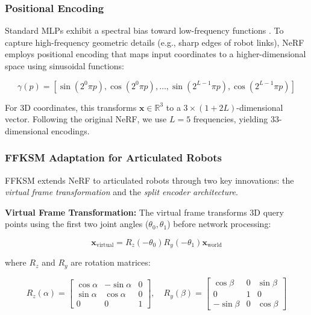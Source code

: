 \documentclass[12pt,a4paper,oneside]{report}
\begin{document}
\subsubsection{Positional Encoding}

Standard MLPs exhibit a spectral bias toward low-frequency functions \cite{rahaman2019spectral}. To capture high-frequency geometric details (e.g., sharp edges of robot links), NeRF employs positional encoding that maps input coordinates to a higher-dimensional space using sinusoidal functions:

\begin{equation}
\gamma(p) = [\sin(2^0 \pi p), \cos(2^0 \pi p), \ldots, \sin(2^{L-1} \pi p), \cos(2^{L-1} \pi p)]
\end{equation}

For 3D coordinates, this transforms $\mathbf{x} \in \mathbb{R}^3$ to a $3 \times (1 + 2L)$-dimensional vector. Following the original NeRF, we use $L = 5$ frequencies, yielding 33-dimensional encodings.

\subsubsection{FFKSM Adaptation for Articulated Robots}

FFKSM extends NeRF to articulated robots through two key innovations: the \textit{virtual frame transformation} and the \textit{split encoder architecture}.

\textbf{Virtual Frame Transformation:} The virtual frame transforms 3D query points using the first two joint angles ($\theta_0, \theta_1$) before network processing:

\begin{equation}
\mathbf{x}_{\text{virtual}} = R_z(-\theta_0) R_y(-\theta_1) \mathbf{x}_{\text{world}}
\end{equation}

where $R_z$ and $R_y$ are rotation matrices:

\begin{equation}
R_z(\alpha) = \begin{bmatrix}
\cos\alpha & -\sin\alpha & 0 \\
\sin\alpha & \cos\alpha & 0 \\
0 & 0 & 1
\end{bmatrix}, \quad
R_y(\beta) = \begin{bmatrix}
\cos\beta & 0 & \sin\beta \\
0 & 1 & 0 \\
-\sin\beta & 0 & \cos\beta
\end{bmatrix}
\end{equation}
\end{document}
